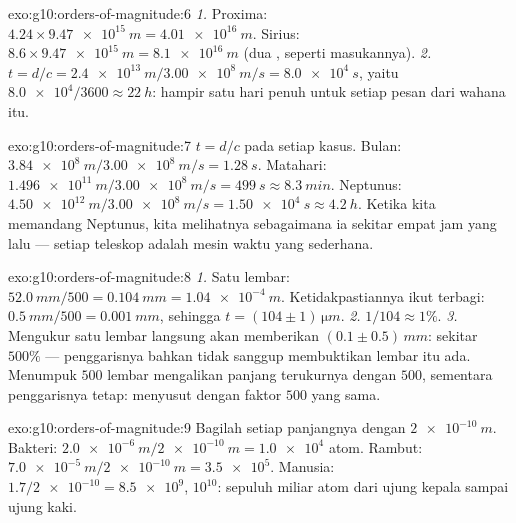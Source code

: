 \begin{solution}{exo:g10:orders-of-magnitude:6}
\emph{1.} Proxima:
$4.24 \times \qty{9.47e15}{m} = \qty{4.01e16}{m}$. Sirius:
$8.6 \times \qty{9.47e15}{m} = \qty{8.1e16}{m}$ (dua ,
seperti masukannya).
\emph{2.} $t = d/c = \qty{2.4e13}{m} / \qty{3.00e8}{m/s}
= \qty{8.0e4}{s}$, yaitu $\num{8.0e4}/3600 \approx \qty{22}{h}$:
hampir satu hari penuh untuk setiap pesan dari wahana itu.
\end{solution}

\begin{solution}{exo:g10:orders-of-magnitude:7}
$t = d/c$ pada setiap kasus. Bulan:
$\qty{3.84e8}{m}/\qty{3.00e8}{m/s} = \qty{1.28}{s}$. Matahari:
$\qty{1.496e11}{m}/\qty{3.00e8}{m/s} = \qty{499}{s} \approx
\qty{8.3}{min}$. Neptunus:
$\qty{4.50e12}{m}/\qty{3.00e8}{m/s} = \qty{1.50e4}{s} \approx
\qty{4.2}{h}$. Ketika kita memandang Neptunus, kita melihatnya
sebagaimana ia sekitar empat jam yang lalu --- setiap teleskop adalah
mesin waktu yang sederhana.
\end{solution}

\begin{solution}{exo:g10:orders-of-magnitude:8}
\emph{1.} Satu lembar: $\qty{52.0}{mm}/500 = \qty{0.104}{mm}
= \qty{1.04e-4}{m}$. Ketidakpastiannya ikut terbagi:
$\qty{0.5}{mm}/500 = \qty{0.001}{mm}$, sehingga
$t = (104 \pm 1)\,\unit{\micro m}$.
\emph{2.} $1/104 \approx 1\%$.
\emph{3.} Mengukur satu lembar langsung akan memberikan
$(0.1 \pm 0.5)\,\unit{mm}$:  sekitar $500\%$
--- penggarisnya bahkan tidak sanggup membuktikan lembar itu ada.
Menumpuk $500$ lembar mengalikan panjang terukurnya dengan $500$,
sementara  penggarisnya tetap:  menyusut dengan faktor $500$ yang sama.
\end{solution}

\begin{solution}{exo:g10:orders-of-magnitude:9}
Bagilah setiap panjangnya dengan $\qty{2e-10}{m}$. Bakteri:
$\qty{2.0e-6}{m}/\qty{2e-10}{m} = \num{1.0e4}$ atom. Rambut:
$\qty{7.0e-5}{m}/\qty{2e-10}{m} = \num{3.5e5}$. Manusia:
$1.7/\num{2e-10} = \num{8.5e9}$,  $10^{10}$: sepuluh
miliar atom dari ujung kepala sampai ujung kaki.
\end{solution}

